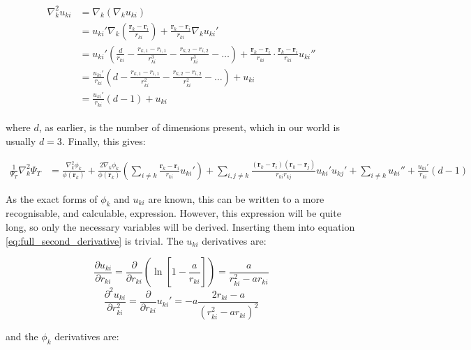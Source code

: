 \documentclass[english, a4paper]{article}
\newcommand{\bm}[1]{\mathbf{#1}}
\begin{document}
\begin{align}
	\begin{split}
	\nabla_k^2 u_{ki} &= \nabla_k(\nabla_ku_{ki})\\
	&= u_{ki}'\nabla_k\left(\frac{\bm{r}_k - \bm{r}_i}{r_{ki}}\right) + \frac{\bm{r}_k - \bm{r}_i}{r_{ki}}\nabla_k u_{ki}'\\
	&= u_{ki}' \left(\frac{d}{r_{ki}} - \frac{r_{k,1}-r_{i,1}}{r_{ki}^3} - \frac{r_{k,2}-r_{i,2}}{r_{ki}^3} - \ldots\right) + \frac{\bm{r}_k - \bm{r}_i}{r_{ki}}\cdot\frac{\bm{r}_k - \bm{r}_i}{r_{ki}} u_{ki}''\\
	&= \frac{u_{ki}'}{r_{ki}} \left(d - \frac{r_{k,1}-r_{i,1}}{r_{ki}^2} - \frac{r_{k,2}-r_{i,2}}{r_{ki}^2} - \ldots\right) + u_{ki}\\
	&= \frac{u_{ki}'}{r_{ki}} \left(d - 1\right) + u_{ki}
	\end{split}
\end{align}

where $d$, as earlier, is the number of dimensions present, which in our world is usually $d=3$. Finally, this gives:

\begin{align}
\frac{1}{\Psi_T}\nabla_k^2\Psi_T &= \frac{\nabla_k^2\phi_k}{\phi(\bm{r}_k)} + \frac{2\nabla_k\phi_k}{\phi(\bm{r}_k)}\left(\sum_{i\neq k} \frac{\bm{r}_k - \bm{r}_i}{r_{ki}} u_{ki}' \right) + \sum_{i,j\neq k}\frac{(\bm{r}_k - \bm{r}_i)(\bm{r}_k - \bm{r}_j)}{r_{ki}r_{kj}}u_{ki}'u_{kj}' + \sum_{i\neq k} u_{ki}'' + \frac{u_{ki}'}{r_{ki}} \left(d - 1\right)
\label{eq:full_second_derivative}
\end{align}

As the exact forms of $\phi_k$ and $u_{ki}$ are known, this can be written to a more recognisable, and calculable, expression. However, this expression will be quite long, so only the necessary variables will be derived. Inserting them into equation \ref{eq:full_second_derivative} is trivial. The $u_{ki}$ derivatives are:

\begin{equation}
	\frac{\partial u_{ki}}{\partial r_{ki}} = \frac{\partial}{\partial r_{ki}}\left(\ln\left[1-\frac{a}{r_{ki}}\right]\right) = \frac{a}{r_{ki}^2 - ar_{ki}}
\end{equation}
\begin{equation}
	\frac{\partial^2 u_{ki}}{\partial r_{ki}^2} = \frac{\partial}{\partial r_{ki}} u_{ki}' = -a\frac{2r_{ki} - a}{(r_{ki}^2 - ar_{ki})^2}
\end{equation}

and the $\phi_k$ derivatives are:
\end{document}
